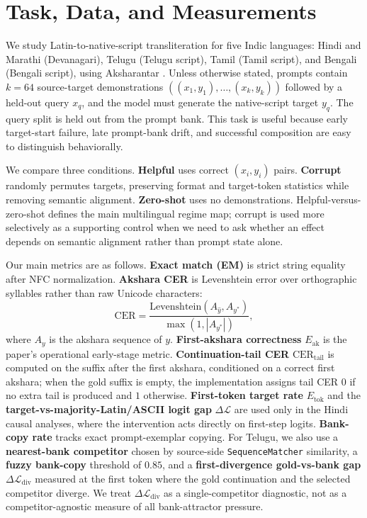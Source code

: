 \documentclass{article}
\begin{document}
\section{Task, Data, and Measurements}\label{sec:task}

We study Latin-to-native-script transliteration for five Indic languages: Hindi and Marathi (Devanagari), Telugu (Telugu script), Tamil (Tamil script), and Bengali (Bengali script), using Aksharantar \citep{aksharantar}. Unless otherwise stated, prompts contain $k{=}64$ source-target demonstrations $((x_1,y_1),\ldots,(x_k,y_k))$ followed by a held-out query $x_q$, and the model must generate the native-script target $y_q$. The query split is held out from the prompt bank. This task is useful because early target-start failure, late prompt-bank drift, and successful composition are easy to distinguish behaviorally.

We compare three conditions. \textbf{Helpful} uses correct $(x_i,y_i)$ pairs. \textbf{Corrupt} randomly permutes targets, preserving format and target-token statistics while removing semantic alignment. \textbf{Zero-shot} uses no demonstrations. Helpful-versus-zero-shot defines the main multilingual regime map; corrupt is used more selectively as a supporting control when we need to ask whether an effect depends on semantic alignment rather than prompt state alone.

Our main metrics are as follows. \textbf{Exact match (EM)} is strict string equality after NFC normalization. \textbf{Akshara CER} is Levenshtein error over orthographic syllables rather than raw Unicode characters:
\begin{equation}
\mathrm{CER} = \frac{\mathrm{Levenshtein}(A_{\hat y},A_{y^*})}{\max(1,|A_{y^*}|)},
\end{equation}
where $A_y$ is the akshara sequence of $y$. \textbf{First-akshara correctness} $E_{\mathrm{ak}}$ is the paper's operational early-stage metric. \textbf{Continuation-tail CER} $\mathrm{CER}_{\mathrm{tail}}$ is computed on the suffix after the first akshara, conditioned on a correct first akshara; when the gold suffix is empty, the implementation assigns tail CER $0$ if no extra tail is produced and $1$ otherwise. \textbf{First-token target rate} $E_{\mathrm{tok}}$ and the \textbf{target-vs-majority-Latin/ASCII logit gap} $\Delta \mathcal{L}$ are used only in the Hindi causal analyses, where the intervention acts directly on first-step logits. \textbf{Bank-copy rate} tracks exact prompt-exemplar copying. For Telugu, we also use a \textbf{nearest-bank competitor} chosen by source-side \texttt{SequenceMatcher} similarity, a \textbf{fuzzy bank-copy} threshold of $0.85$, and a \textbf{first-divergence gold-vs-bank gap} $\Delta \mathcal{L}_{\mathrm{div}}$ measured at the first token where the gold continuation and the selected competitor diverge. We treat $\Delta \mathcal{L}_{\mathrm{div}}$ as a single-competitor diagnostic, not as a competitor-agnostic measure of all bank-attractor pressure.
\end{document}
